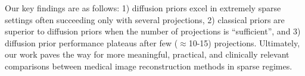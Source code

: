 Our key findings are as follows: 1) diffusion priors excel in extremely sparse settings often succeeding only with several projections, 2) classical priors are superior to diffusion priors when the number of projections is ``sufficient'', and 3) diffusion prior performance plateaus after few ($\approx$10-15) projections.
Ultimately, our work paves the way for more meaningful, practical, and clinically relevant comparisons between medical image reconstruction methods in sparse regimes.